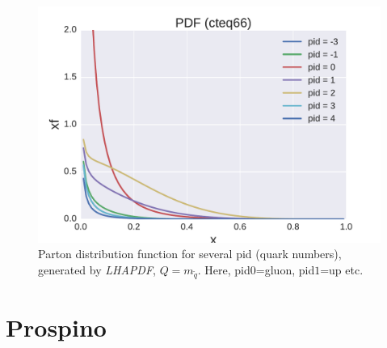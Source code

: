 \documentclass[11pt]{article}
\begin{document}
\begin{figure}[H]
\centering
\includegraphics[scale=0.5]{plots/PDF_pids12.pdf}
\caption{Parton distribution function for several pid (quark numbers), generated by \textit{LHAPDF}, $Q=m_{\tilde{q}}$. Here, pid$0$=gluon, pid$1$=up etc.}
\label{fig::PDF 1 2}
\end{figure}



\section{Prospino}
\end{document}
